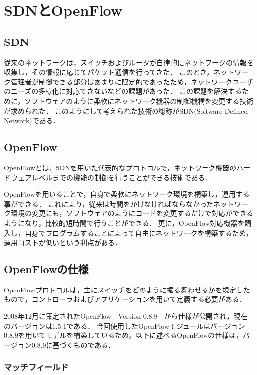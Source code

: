 \section{SDNとOpenFlow}

\subsection{SDN}

従来のネットワークは，スイッチおよびルータが自律的にネットワークの情報を収集し，その情報に応じてパケット通信を行ってきた\cite{openflownet}．
このとき，ネットワーク管理者が制御できる部分はあまりに限定的であったため，ネットワークユーザのニーズの多様化に対応できないなどの課題があった．
この課題を解決するために，ソフトウェアのように柔軟にネットワーク機器の制御機構を変更する技術が求められた．
このようにして考えられた技術の総称がSDN(Software Defined Network)である．

\subsection{OpenFlow}

OpenFlowとは，SDNを用いた代表的なプロトコルで，ネットワーク機器のハードウェアレベルまでの機能の制御を行うことができる技術である\cite{openflowjapanese}．

OpenFlowを用いることで，自身で柔軟にネットワーク環境を構築し，運用する事ができる．
これにより，従来は時間をかけなければならなかったネットワーク環境の変更にも，ソフトウェアのようにコードを変更するだけで対応ができるようになり，比較的短時間で行うことができる．
更に，OpenFlow対応機器を購入し，自身でプログラムすることによって自由にネットワークを構築するため，運用コストが低いという利点がある．

\subsection{OpenFlowの仕様}

OpenFlowプロトコルは，主にスイッチをどのように振る舞わせるかを規定したもので，コントローラおよびアプリケーションを用いて定義する必要がある．

2008年12月に策定されたOpenFlow　Version 0.8.9\cite{openflow}　から仕様が公開され，現在のバージョンは1.5.1である．
今回使用したOpenFlowモジュールはバージョン0.8.9を用いてモデルを構築しているため，以下に述べるOpenFlowの仕様は，バージョン0.8.9に基づくものである．

\subsubsection{マッチフィールド}

